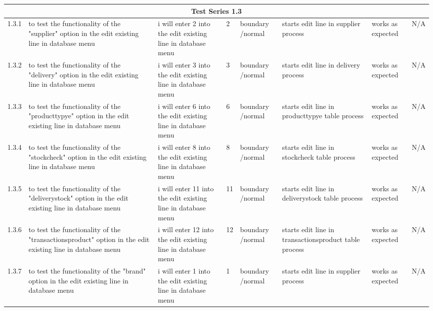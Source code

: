 \begin{landscape}
\begin{center}
\begin{longtable}{|p{1.5cm}|p{2.5cm}|p{2.5cm}|p{2cm}|p{2cm}|p{2cm}|p{2cm}|p{2cm}|}
\multicolumn{8}{c}{Test Series 1.3}\\ \hline
1.3.1 & to test the functionality of the "supplier" option in the edit existing line in database menu & i will enter 2 into the edit existing line in database menu & 2 & boundary /normal & starts edit line in supplier process & works as expected & N/A \\ \hline
1.3.2 & to test the functionality of the "delivery" option in the edit existing line in database menu & i will enter 3 into the edit existing line in database menu & 3 & boundary /normal & starts edit line in delivery process & works as expected & N/A \\ \hline
1.3.3 & to test the functionality of the "producttypye" option in the edit existing line in database menu & i will enter 6 into the edit existing line in database menu & 6 & boundary /normal & starts edit line in producttypye table process & works as expected & N/A \\ \hline
1.3.4 & to test the functionality of the "stockcheck" option in the edit existing line in database menu & i will enter 8 into the edit existing line in database menu & 8 & boundary /normal & starts edit line in stockcheck table process & works as expected & N/A \\ \hline
1.3.5 & to test the functionality of the "deliverystock" option in the edit existing line in database menu & i will enter 11 into the edit existing line in database menu & 11 & boundary /normal & starts edit line in deliverystock table process & works as expected & N/A \\ \hline
1.3.6 & to test the functionality of the "transactionsproduct" option in the edit existing line in database menu & i will enter 12 into the edit existing line in database menu & 12 & boundary /normal & starts edit line in transactionsproduct table process & works as expected & N/A \\ \hline
1.3.7 & to test the functionality of the "brand" option in the edit existing line in database menu & i will enter 1 into the edit existing line in database menu & 1 & boundary /normal & starts edit line in supplier process & works as expected & N/A \\ \hline 


\end{longtable}
\end{center}
\end{landscape}
